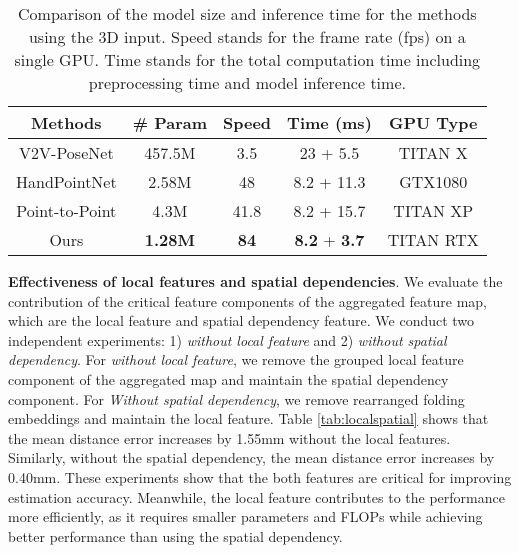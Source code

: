 \documentclass[10pt,twocolumn,letterpaper]{article}
\begin{document}
\begin{table}[h!]
\small
\setlength\tabcolsep{3pt}\begin{center}

\begin{tabular}{c|cccc}
\hline
Methods         & \# Param & Speed &Time (ms) & GPU Type\\
\hline
V2V-PoseNet \cite{moon2018v2v}     & 457.5M    & 3.5 & 23 + 5.5 & TITAN X\\
HandPointNet \cite{ge2018hand}    & 2.58M     & 48 & 8.2 + 11.3 & GTX1080\\
Point-to-Point \cite{ge2018point}  & 4.3M      & 41.8 & 8.2 + 15.7 & TITAN XP\\
Ours            & \textbf{1.28M}     & \textbf{84}   & \textbf{8.2} + \textbf{3.7} & TITAN RTX\\ 
\hline

\end{tabular}
\end{center}
\caption{Comparison of the model size and inference time for the methods using the 3D input. Speed stands for the frame rate (fps) on a single GPU. Time stands for the total computation time including preprocessing time and model inference time.}
\label{tab:speed}
\end{table}

\noindent
\textbf{Effectiveness of local features and spatial dependencies}.
We evaluate the contribution of the critical feature components of the aggregated feature map, which are the local feature and spatial dependency feature. We conduct two independent experiments: 1) \textit{without local feature} and 2) \textit{without spatial dependency}. For \textit{without local feature}, we remove the grouped local feature component of the aggregated map and maintain the spatial dependency component. For \textit{Without spatial dependency}, we remove rearranged folding embeddings and maintain the local feature. Table \ref{tab:localspatial} shows that the mean distance error increases by 1.55mm without the local features. Similarly, without the spatial dependency, the mean distance error increases by 0.40mm. These experiments show that the both features are critical for improving estimation accuracy. Meanwhile, the local feature contributes to the performance more efficiently, as it requires smaller parameters and FLOPs while achieving better performance than using the spatial dependency.
\end{document}
